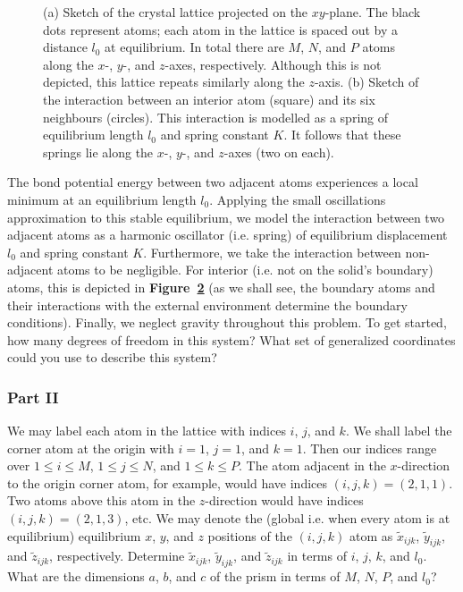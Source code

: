 \documentclass[letterpaper,12pt]{article}
\begin{document}
\begin{flushleft}
\begin{figure}[h]
\begin{subfigure}[b]{0.3\textwidth}
            \caption{}
            \label{fig:I3}
        \end{subfigure}
        \caption{(a) Sketch of the crystal lattice projected on the $xy$-plane. The black dots represent atoms; each atom in the lattice is spaced out by a distance $l_0$ at equilibrium. In total there are $M$, $N$, and $P$ atoms along the $x$-, $y$-, and $z$-axes, respectively. Although this is not depicted, this lattice repeats similarly along the $z$-axis. (b) Sketch of the interaction between an interior atom (square) and its six neighbours (circles). This interaction is modelled as a spring of equilibrium length $l_0$ and spring constant $K$. It follows that these springs lie along the $x$-, $y$-, and $z$-axes (two on each).}
    \end{figure}
    The bond potential energy between two adjacent atoms experiences a local minimum at an equilibrium length $l_0$. Applying the small oscillations approximation to this stable equilibrium, we model the interaction between two adjacent atoms as a harmonic oscillator (i.e. spring) of equilibrium displacement $l_0$ and spring constant $K$. Furthermore, we take the interaction between non-adjacent atoms to be negligible. For interior (i.e. not on the solid's boundary) atoms, this is depicted in \textbf{Figure~\ref{fig:I3}} (as we shall see, the boundary atoms and their interactions with the external environment determine the boundary conditions). Finally, we neglect gravity throughout this problem.\newline\newline
    To get started, how many degrees of freedom in this system? What set of generalized coordinates could you use to describe this system?

    \subsubsection*{Part II}
    We may label each atom in the lattice with indices $i$, $j$, and $k$. We shall label the corner atom at the origin with $i = 1$, $j = 1$, and $k = 1$. Then our indices range over $1 \leq i \leq M$, $1 \leq j \leq N$, and $1 \leq k \leq P$. The atom adjacent in the $x$-direction to the origin corner atom, for example, would have indices $(i, j, k) = (2, 1, 1)$. Two atoms above this atom in the $z$-direction would have indices $(i, j, k) = (2, 1, 3)$, etc. We may denote the (global i.e. when every atom is at equilibrium) equilibrium $x$, $y$, and $z$ positions of the $(i, j, k)$ atom as $\tilde{x}_{ijk}$, $\tilde{y}_{ijk}$, and $\tilde{z}_{ijk}$, respectively. \newline\newline
    Determine $\tilde{x}_{ijk}$, $\tilde{y}_{ijk}$, and $\tilde{z}_{ijk}$ in terms of $i$, $j$, $k$, and $l_0$. What are the dimensions $a$, $b$, and $c$ of the prism in terms of $M$, $N$, $P$, and $l_0$?


\end{flushleft}
\end{document}
